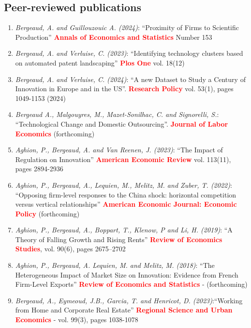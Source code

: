 \documentclass[12pt]{article}
\begin{document}
\subsection*{Peer-reviewed publications}
\begin{footnotesize}
    \begin{enumerate}
    \item \emph{Bergeaud, A. and Guillouzouic A. (2024)}: ``Proximity of Firms to Scientific Production''  \textbf{\textcolor{red}{Annals of Economics and Statistics}} Number 153
    \item \emph{Bergeaud, A. and Verluise, C.  (2023)}: ``Identifying technology clusters based on automated patent landscaping'' \textbf{\textcolor{red}{Plos One}} vol. 18(12)
    \item \emph{Bergeaud, A. and Verluise, C.  (2024)}: ``A new Dataset to Study a Century of Innovation in Europe and in the US''. \textbf{\textcolor{red}{Research Policy}} vol. 53(1), pages 1049-1153 (2024)
    \item \emph{Bergeaud A., Malgouyres, M., Mazet-Sonilhac, C. and Signorelli, S.}: ``Technological Change and Domestic Outsourcing''. \textbf{\textcolor{red}{Journal of Labor Economics}} (forthcoming)
    \item \emph{Aghion, P., Bergeaud, A. and Van Reenen, J. (2023)}: ``The Impact of Regulation on Innovation'' \textbf{\textcolor{red}{American Economic Review}} vol. 113(11), pages 2894-2936
    \item \emph{Aghion, P., Bergeaud, A., Lequien, M., Melitz, M. and Zuber, T. (2022)}: ``Opposing firm-level responses to the China shock: horizontal competition versus vertical relationships'' \textbf{\textcolor{red}{American Economic Journal: Economic Policy}} (forthcoming)
    \item \emph{Aghion, P., Bergeaud, A., Boppart, T., Klenow, P and Li, H. (2019)}: ``A Theory of Falling Growth and Rising Rents'' \textbf{\textcolor{red}{Review of Economics Studies}}, vol. 90(6), pages 2675–2702 
    \item \emph{Aghion, P., Bergeaud, A. Lequien, M. and Melitz, M. (2018)}: ``The Heterogeneous Impact of Market Size on Innovation: Evidence from French Firm-Level Exports'' \textbf{\textcolor{red}{Review of Economics and Statistics}} - (forthcoming)
    \item \emph{Bergeaud, A., Eymeoud, J.B., Garcia, T. and Henricot, D. (2023)}:``Working from Home and Corporate Real Estate'' \textbf{\textcolor{red}{Regional Science and Urban Economics}} - vol. 99(3), pages 1038-1078

\end{enumerate}
\end{footnotesize}
\end{document}
